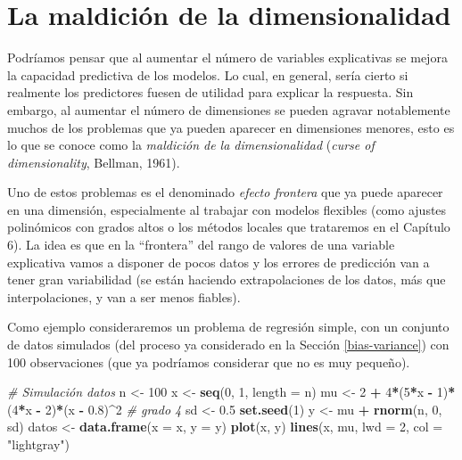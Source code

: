 \documentclass[]{book}
\newenvironment{Shaded}{\begin{snugshade}}{\end{snugshade}}
\newcommand{\KeywordTok}[1]{\textcolor[rgb]{0.13,0.29,0.53}{\textbf{#1}}}
\newcommand{\DataTypeTok}[1]{\textcolor[rgb]{0.13,0.29,0.53}{#1}}
\newcommand{\DecValTok}[1]{\textcolor[rgb]{0.00,0.00,0.81}{#1}}
\newcommand{\FloatTok}[1]{\textcolor[rgb]{0.00,0.00,0.81}{#1}}
\newcommand{\StringTok}[1]{\textcolor[rgb]{0.31,0.60,0.02}{#1}}
\newcommand{\CommentTok}[1]{\textcolor[rgb]{0.56,0.35,0.01}{\textit{#1}}}
\newcommand{\OperatorTok}[1]{\textcolor[rgb]{0.81,0.36,0.00}{\textbf{#1}}}
\newcommand{\NormalTok}[1]{#1}
\theoremstyle{break}
\theoremstyle{definition}
\theoremstyle{definition}
\theoremstyle{definition}
\theoremstyle{remark}
\begin{document}
\section{La maldición de la
dimensionalidad}\label{la-maldiciuxf3n-de-la-dimensionalidad}

Podríamos pensar que al aumentar el número de variables explicativas se
mejora la capacidad predictiva de los modelos. Lo cual, en general,
sería cierto si realmente los predictores fuesen de utilidad para
explicar la respuesta. Sin embargo, al aumentar el número de dimensiones
se pueden agravar notablemente muchos de los problemas que ya pueden
aparecer en dimensiones menores, esto es lo que se conoce como la
\emph{maldición de la dimensionalidad} (\emph{curse of dimensionality},
Bellman, 1961).

Uno de estos problemas es el denominado \emph{efecto frontera} que ya
puede aparecer en una dimensión, especialmente al trabajar con modelos
flexibles (como ajustes polinómicos con grados altos o los métodos
locales que trataremos en el Capítulo 6). La idea es que en la
``frontera'' del rango de valores de una variable explicativa vamos a
disponer de pocos datos y los errores de predicción van a tener gran
variabilidad (se están haciendo extrapolaciones de los datos, más que
interpolaciones, y van a ser menos fiables).

Como ejemplo consideraremos un problema de regresión simple, con un
conjunto de datos simulados (del proceso ya considerado en la Sección
\ref{bias-variance}) con 100 observaciones (que ya podríamos considerar
que no es muy pequeño).

\begin{Shaded}
\begin{Highlighting}[]
\CommentTok{# Simulación datos}
\NormalTok{n <-}\StringTok{ }\DecValTok{100}
\NormalTok{x <-}\StringTok{ }\KeywordTok{seq}\NormalTok{(}\DecValTok{0}\NormalTok{, }\DecValTok{1}\NormalTok{, }\DataTypeTok{length =}\NormalTok{ n)}
\NormalTok{mu <-}\StringTok{ }\DecValTok{2} \OperatorTok{+}\StringTok{ }\DecValTok{4}\OperatorTok{*}\NormalTok{(}\DecValTok{5}\OperatorTok{*}\NormalTok{x }\OperatorTok{-}\StringTok{ }\DecValTok{1}\NormalTok{)}\OperatorTok{*}\NormalTok{(}\DecValTok{4}\OperatorTok{*}\NormalTok{x }\OperatorTok{-}\StringTok{ }\DecValTok{2}\NormalTok{)}\OperatorTok{*}\NormalTok{(x }\OperatorTok{-}\StringTok{ }\FloatTok{0.8}\NormalTok{)}\OperatorTok{^}\DecValTok{2} \CommentTok{# grado 4}
\NormalTok{sd <-}\StringTok{ }\FloatTok{0.5}
\KeywordTok{set.seed}\NormalTok{(}\DecValTok{1}\NormalTok{)}
\NormalTok{y <-}\StringTok{ }\NormalTok{mu }\OperatorTok{+}\StringTok{ }\KeywordTok{rnorm}\NormalTok{(n, }\DecValTok{0}\NormalTok{, sd)}
\NormalTok{datos <-}\StringTok{ }\KeywordTok{data.frame}\NormalTok{(}\DataTypeTok{x =}\NormalTok{ x, }\DataTypeTok{y =}\NormalTok{ y)}
\KeywordTok{plot}\NormalTok{(x, y) }
\KeywordTok{lines}\NormalTok{(x, mu, }\DataTypeTok{lwd =} \DecValTok{2}\NormalTok{, }\DataTypeTok{col =} \StringTok{"lightgray"}\NormalTok{)}
\end{Highlighting}
\end{Shaded}
\end{document}
